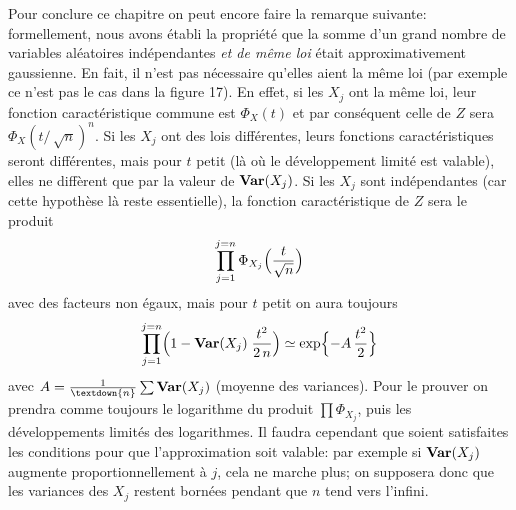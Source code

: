 Pour conclure ce chapitre on peut encore faire la remarque suivante:
formellement,  nous avons \'etabli la propri\'et\'e que la somme d'un grand
nombre de variables al\'eatoires ind\'ependantes {\it et de m\^eme loi} 
\'etait approximativement gaussienne.  En fait,  il n'est pas n\'ecessaire
qu'elles aient la m\^eme loi (par exemple ce n'est pas le cas dans la
figure
17).  En effet,  si les $X_j$ ont la m\^eme loi,  leur fonction
caract\'eristique
commune est $\Phi_X(t)$ et par cons\'equent celle de $Z$
sera
$\Phi_X(t/\,\sqrt{n})^n$.  Si les $X_j$ ont des lois diff\'erentes, 
leurs fonctions caract\'eristiques seront diff\'erentes, mais pour $t$
petit (l\`a
o\`u le d\'eveloppement limit\'e est valable),  elles ne
diff\`erent que par
la valeur de ${\bf Var}(X_j)$.  Si les $X_j$ sont
ind\'ependantes (car cette
hypoth\`ese l\`a reste essentielle), 
la fonction caract\'eristique de $Z$
sera le produit 
$$\prod_{j=1}^{j=n} \Phi_{X_j}\Bigl( {t \over \sqrt{n}}\Bigr)$$ 
avec des facteurs non \'egaux,  mais pour $t$ petit on aura toujours
$$\prod_{j=1}^{j=n} \Bigl( 1 - {\bf Var}(X_j)\; {t^2 \over 2\, n}\Bigr)
\simeq \exp \Bigl\{ - A \, {t^2 \over 2} \Bigr\}$$
avec $A = {1 \over \textdown{n}}\sum {\bf Var} (X_j)$ (moyenne des variances). 
\medskip
Pour le prouver on prendra comme toujours le logarithme du produit
$\prod \Phi_{X_j}$, puis les d\'eveloppements limit\'es des logarithmes. 
Il faudra cependant que soient satisfaites les conditions pour que
l'approximation soit valable:  par exemple si ${\bf Var}(X_j)$ augmente
proportionnellement \`a $j$,  cela ne marche plus;  on supposera donc que
les variances des $X_j$ restent born\'ees pendant que $n$ tend vers l'infini.

\bigskip

